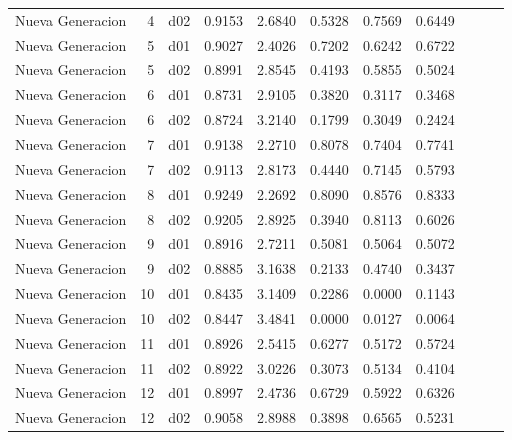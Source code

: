 \begin{landscape}
\begin{longtable}{p{2cm}rrrrrrrrrr}
        Nueva Generacion  &          4 &     d02 &   0.9153 &  2.6840 &        0.5328 &           0.7569 &  0.6449 \\
        Nueva Generacion  &          5 &     d01 &   0.9027 &  2.4026 &        0.7202 &           0.6242 &  0.6722 \\
        Nueva Generacion  &          5 &     d02 &   0.8991 &  2.8545 &        0.4193 &           0.5855 &  0.5024 \\
        Nueva Generacion  &          6 &     d01 &   0.8731 &  2.9105 &        0.3820 &           0.3117 &  0.3468 \\
        Nueva Generacion  &          6 &     d02 &   0.8724 &  3.2140 &        0.1799 &           0.3049 &  0.2424 \\
        Nueva Generacion  &          7 &     d01 &   0.9138 &  2.2710 &        0.8078 &           0.7404 &  0.7741 \\
        Nueva Generacion  &          7 &     d02 &   0.9113 &  2.8173 &        0.4440 &           0.7145 &  0.5793 \\
        Nueva Generacion  &          8 &     d01 &   0.9249 &  2.2692 &        0.8090 &           0.8576 &  0.8333 \\
        Nueva Generacion  &          8 &     d02 &   0.9205 &  2.8925 &        0.3940 &           0.8113 &  0.6026 \\
        Nueva Generacion  &          9 &     d01 &   0.8916 &  2.7211 &        0.5081 &           0.5064 &  0.5072 \\
        Nueva Generacion  &          9 &     d02 &   0.8885 &  3.1638 &        0.2133 &           0.4740 &  0.3437 \\
        Nueva Generacion  &         10 &     d01 &   0.8435 &  3.1409 &        0.2286 &           0.0000 &  0.1143 \\
        Nueva Generacion  &         10 &     d02 &   0.8447 &  3.4841 &        0.0000 &           0.0127 &  0.0064 \\
        Nueva Generacion  &         11 &     d01 &   0.8926 &  2.5415 &        0.6277 &           0.5172 &  0.5724 \\
        Nueva Generacion  &         11 &     d02 &   0.8922 &  3.0226 &        0.3073 &           0.5134 &  0.4104 \\
        Nueva Generacion  &         12 &     d01 &   0.8997 &  2.4736 &        0.6729 &           0.5922 &  0.6326 \\
        Nueva Generacion  &         12 &     d02 &   0.9058 &  2.8988 &        0.3898 &           0.6565 &  0.5231 \\

\end{longtable}
\end{landscape}
